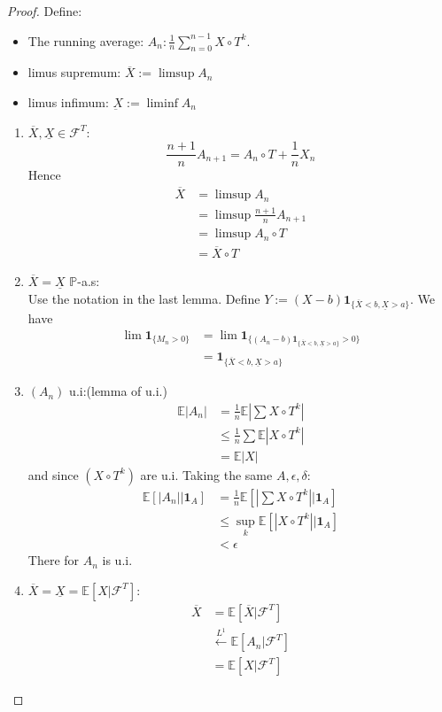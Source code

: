 \documentclass[a4paper,11pt]{book}
\theoremstyle{definition}
\theoremstyle{remark}
\begin{document}
\begin{proof}
Define:
\begin{itemize}
		\item The running average: $A_n:\frac{1}{n} \sum_{n = 0}^{n-1} X \circ T^k$.
		\item limus supremum: $\overline{X}:= \limsup A_n$
		\item limus infimum: $\underbar{X} := \liminf A_n$
\end{itemize}
\begin{enumerate}
	\item \textbf{$\overline{X}, \underline{X} \in \mathcal{F}^T$}:
	\begin{equation*}
		\frac{n + 1}{n} A_{n+1} = A_n \circ T + \frac{1}{n} X_n
	\end{equation*}
	Hence
	\begin{align*}
		\overline{X} &= \limsup A_n\\
		&= \limsup \frac{n+1}{n} A_{n+1}\\
		&= \limsup A_n \circ T\\
		&= \overline{X} \circ T
	\end{align*}
	
	\item $\overline{X} = \underline{X}$ $\mathbb{P}$-a.s:\\
	Use the notation in the last lemma. Define $Y:= (X - b) \textbf{1}_{\{\overline{X} < b, \underline{X} > a \}}$. We have
	\begin{align*}
		\lim \textbf{1}_{\{M_n > 0\}} &= \lim \textbf{1}_{\{(A_n - b) \textbf{1}_{\{\overline{X} < b, \underline{X} > a \}} > 0 \}} \\
		&= \textbf{1}_{\{\overline{X} < b, \underline{X} > a \}}
	\end{align*}
	
	\item $(A_n)$ u.i:(lemma of u.i.)
	\begin{align*}
		\mathbb{E}|A_n| &= \frac{1}{n}\mathbb{E}|\sum X \circ T^k|\\
		&\leq \frac{1}{n} \sum \mathbb{E}|X \circ T^k|\\
		&= \mathbb{E}|X|
	\end{align*}
	and since $(X \circ T^k)$ are u.i. Taking the same $A, \epsilon, \delta$: 
	\begin{align*}
		\mathbb{E}[|A_n|| \textbf{1}_A] &= \frac{1}{n} \mathbb{E}[|\sum X \circ T^k| | \textbf{1}_A]\\
		&\leq \sup_k \mathbb{E}[|X \circ T^k||\textbf{1}_A]\\
		& < \epsilon
	\end{align*}
	There for $A_n$ is u.i.
	\item $\overline{X} = \underline{X} = \mathbb{E}[X|\mathcal{F}^T]$:
	\begin{align*}
		\overline{X} &= \mathbb{E}[\overline{X}|\mathcal{F}^T]\\
		&\overset{L^1}\leftarrow \mathbb{E}[A_n|\mathcal{F}^T]\\
		&= \mathbb{E}[X|\mathcal{F}^T]
	\end{align*}
	
\end{enumerate}
\end{proof}
\end{document}

